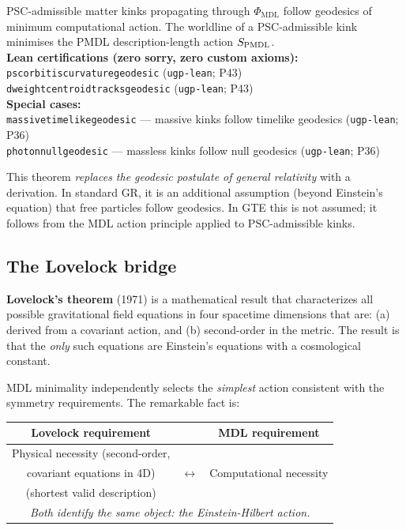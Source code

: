 \documentclass[11pt,a4paper]{article}
\newcommand{\term}[1]{\textbf{#1}}
\newcommand{\lean}[1]{\begingroup\def\_{\textunderscore\allowbreak}\texttt{#1}\endgroup}
\newcommand{\PHIMDL}{\Phi_{\mathrm{MDL}}}
\begin{document}
\begin{tcolorbox}[colback=boxorange,colframe=orange!60!black,
  title={Theorem: Geodesic Computation Theorem (machine-certified, zero custom axioms)}]
PSC-admissible matter kinks propagating through $\PHIMDL$ follow geodesics of
minimum computational action.  The worldline of a PSC-admissible kink minimises
the PMDL description-length action $S_{\rm PMDL}$.\\[4pt]
\textbf{Lean certifications (zero sorry, zero custom axioms):}\\
\lean{psc\_orbit\_is\_curvature\_geodesic} \quad (\texttt{ugp-lean}; P43)\\
\lean{dweight\_centroid\_tracks\_geodesic} \quad (\texttt{ugp-lean}; P43)\\[4pt]
\textbf{Special cases:}\\
\lean{massive\_timelike\_geodesic} --- massive kinks follow timelike geodesics (\texttt{ugp-lean}; P36)\\
\lean{photon\_null\_geodesic} --- massless kinks follow null geodesics (\texttt{ugp-lean}; P36)
\end{tcolorbox}

This theorem \emph{replaces the geodesic postulate of general relativity} with a
derivation.  In standard GR, it is an additional assumption (beyond Einstein's
equation) that free particles follow geodesics.  In GTE this is not assumed; it
follows from the MDL action principle applied to PSC-admissible kinks.

\subsection{The Lovelock bridge}

\term{Lovelock's theorem} (1971) is a mathematical result that characterizes all
possible gravitational field equations in four spacetime dimensions that are:
(a) derived from a covariant action, and (b) second-order in the metric.
The result is that the \emph{only} such equations are Einstein's equations with a
cosmological constant.

MDL minimality independently selects the \emph{simplest} action consistent with
the symmetry requirements.  The remarkable fact is:

\begin{center}
\begin{tabular}{ccc}
\toprule
Lovelock requirement & & MDL requirement \\
\midrule
Physical necessity (second-order,\\covariant equations in 4D) &
$\longleftrightarrow$ &
Computational necessity\\(shortest valid description) \\
\bottomrule
\multicolumn{3}{c}{\textit{Both identify the same object: the Einstein-Hilbert action.}}
\end{tabular}
\end{center}
\end{document}
